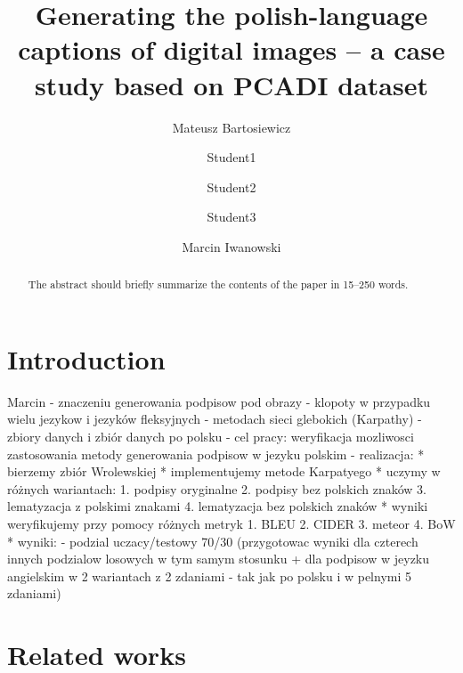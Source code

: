 \documentclass[runningheads]{llncs}
\begin{document}
%
\title{Generating the polish-language captions of digital images -- a case study based on PCADI dataset}
%
%
\author{Mateusz Bartosiewicz \and
Student1 \and Student2 \and Student3 \and
Marcin Iwanowski}
%
%
%
%
\maketitle              %
%
\begin{abstract}
The abstract should briefly summarize the contents of the paper in
15--250 words.

\end{abstract}
%
%
\section{Introduction}

Marcin
- znaczeniu generowania podpisow pod obrazy
- klopoty w przypadku wielu jezykow i jezyków fleksyjnych
- metodach sieci glebokich (Karpathy)
- zbiory danych i zbiór danych po polsku
- cel pracy: weryfikacja mozliwosci zastosowania metody generowania podpisow w jezyku polskim 
- realizacja: 
* bierzemy zbiór Wrolewskiej
* implementujemy metode Karpatyego
* uczymy w różnych wariantach:
1. podpisy oryginalne
2. podpisy bez polskich znaków
3. lematyzacja z polskimi znakami
4. lematyzacja bez polskich znaków
* wyniki weryfikujemy przy pomocy różnych metryk
1. BLEU
2. CIDER
3. meteor
4. BoW
* wyniki:
- podzial uczacy/testowy 70/30 (przygotowac wyniki dla czterech innych podzialow losowych w tym samym stosunku + dla podpisow w jeyzku angielskim w 2 wariantach z 2 zdaniami - tak jak po polsku i w pelnymi 5 zdaniami)

\section{Related works}
\end{document}
